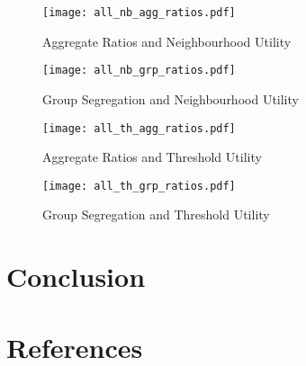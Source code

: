 \documentclass[12pt, a4paper]{article}
\begin{document}
\begin{figure}[bp!]
\centering
\caption{Aggregate Ratios and Neighbourhood Utility}
\texttt{[image: all\_nb\_agg\_ratios.pdf]}
\end{figure}

\begin{figure}[bp!]
\centering
\caption{Group Segregation and Neighbourhood Utility}
\texttt{[image: all\_nb\_grp\_ratios.pdf]}
\end{figure}

\begin{figure}[bp!]
\centering
\caption{Aggregate Ratios and Threshold Utility}
\texttt{[image: all\_th\_agg\_ratios.pdf]}
\end{figure}

\begin{figure}[bp!]
\centering
\caption{Group Segregation and Threshold Utility}
\texttt{[image: all\_th\_grp\_ratios.pdf]}
\end{figure}



\section{\label{sec_conc}Conclusion}




\newpage

%
%

\section*{\label{sec_ref}References}
\end{document}
